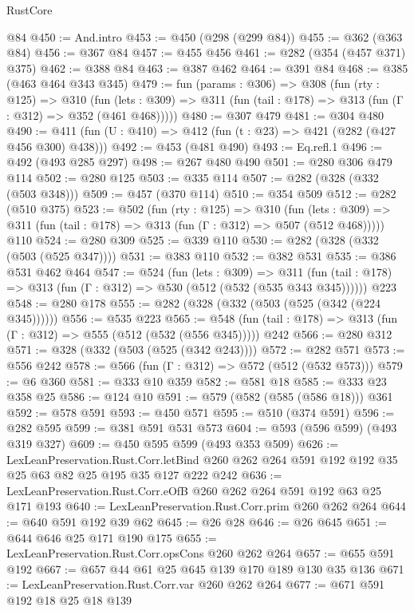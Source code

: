 \begin{lexlean}{RustCore}
\begin{coremodule}
    @84
@450 := And.intro
@453 := @450 (@298 (@299 @84))
@455 := @362 (@363 @84)
@456 := @367 @84
@457 := @455 @456
@461 := @282 (@354 (@457 @371) @375)
@462 := @388 @84
@463 := @387 @462
@464 := @391 @84
@468 := @385 (@463 @464 @343 @345)
@479 := fun (params : @306) =>
  @308
    (fun (rty : @125) =>
    @310
      (fun (lets : @309) => @311 (fun (tail : @178) => @313 (fun (Γ : @312) => @352 (@461 @468)))))
@480 := @307 @479
@481 := @304 @480
@490 := @411 (fun (U : @410) => @412 (fun (t : @23) => @421 (@282 (@427 @456 @300) @438)))
@492 := @453 (@481 @490)
@493 := Eq.refl.{1}
@496 := @492 (@493 @285 @297)
@498 := @267 @480 @490
@501 := @280 @306 @479 @114
@502 := @280 @125
@503 := @335 @114
@507 := @282 (@328 (@332 (@503 @348)))
@509 := @457 (@370 @114)
@510 := @354 @509
@512 := @282 (@510 @375)
@523 := @502
    (fun (rty : @125) =>
    @310
      (fun (lets : @309) => @311 (fun (tail : @178) => @313 (fun (Γ : @312) => @507 (@512 @468)))))
    @110
@524 := @280 @309
@525 := @339 @110
@530 := @282 (@328 (@332 (@503 (@525 @347))))
@531 := @383 @110
@532 := @382 @531
@535 := @386 @531 @462 @464
@547 := @524
    (fun (lets : @309) =>
    @311 (fun (tail : @178) => @313 (fun (Γ : @312) => @530 (@512 (@532 (@535 @343 @345))))))
    @223
@548 := @280 @178
@555 := @282 (@328 (@332 (@503 (@525 (@342 (@224 @345))))))
@556 := @535 @223
@565 := @548 (fun (tail : @178) => @313 (fun (Γ : @312) => @555 (@512 (@532 (@556 @345))))) @242
@566 := @280 @312
@571 := @328 (@332 (@503 (@525 (@342 @243))))
@572 := @282 @571
@573 := @556 @242
@578 := @566 (fun (Γ : @312) => @572 (@512 (@532 @573)))
@579 := @6 @360
@581 := @333 @10 @359
@582 := @581 @18
@585 := @333 @23 @358 @25
@586 := @124 @10
@591 := @579 (@582 (@585 (@586 @18))) @361
@592 := @578 @591
@593 := @450 @571
@595 := @510 (@374 @591)
@596 := @282 @595
@599 := @381 @591 @531 @573
@604 := @593 (@596 @599) (@493 @319 @327)
@609 := @450 @595 @599 (@493 @353 @509)
@626 := LexLeanPreservation.Rust.Corr.letBind
    @260
    @262
    @264
    @591
    @192
    @192
    @35
    @25
    @63
    @82
    @25
    @195
    @35
    @127
    @222
    @242
@636 := LexLeanPreservation.Rust.Corr.eOfB @260 @262 @264 @591 @192 @63 @25 @171 @193
@640 := LexLeanPreservation.Rust.Corr.prim @260 @262 @264
@644 := @640 @591 @192 @39 @62
@645 := @26 @28
@646 := @26 @645
@651 := @644 @646 @25 @171 @190 @175
@655 := LexLeanPreservation.Rust.Corr.opsCons @260 @262 @264
@657 := @655 @591 @192
@667 := @657 @44 @61 @25 @645 @139 @170 @189 @130 @35 @136
@671 := LexLeanPreservation.Rust.Corr.var @260 @262 @264
@677 := @671 @591 @192 @18 @25 @18 @139

\end{coremodule}
\end{lexlean}
